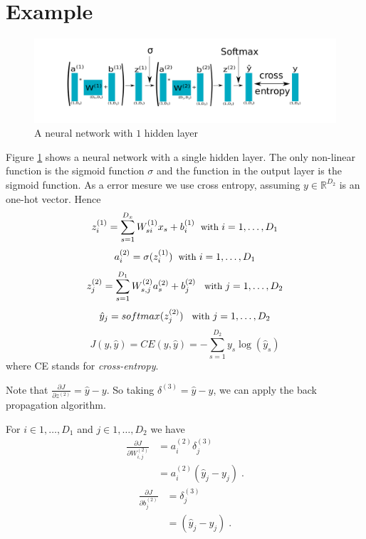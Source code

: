 \documentclass{article}
\begin{document}
\section{Example}

\begin{figure}
\begin{center}
\includegraphics[scale=0.85]{example.pdf}
\end{center}
\caption{A neural network with $1$ hidden layer}
\label{example}
\end{figure}
Figure \ref{example} shows a neural network with a single hidden layer. The only non-linear function is the sigmoid function $\sigma$ and the function in the output layer is the sigmoid function. As a error mesure we use cross entropy, assuming $y \in \mathbb{R}^{D_2}$ is an one-hot vector. Hence
\begin{equation}\label{eq:12}
z^{(1)}_i = \sum_{s=1}^{D_{x}}W^{(1)}_{si} x_{s} + b^{(1)}_{i}  \; {\small \text{ with }i = 1, \dots, D_{1}}
\end{equation}
\begin{equation}\label{eq:13}
a^{(2)}_i = \sigma(z^{(1)}_i )  \; {\small \text{ with }i = 1, \dots,D_{1}}
\end{equation}
\begin{equation}\label{eq:14}
z^{(2)}_j = \sum_{s=1}^{D_{1}}W^{(2)}_{s,j} a^{(2)}_{s} + b^{(2)}_{j} \;\; {\small \text{ with }j = 1, \dots, D_{2}}
\end{equation}
\begin{equation}\label{eq:15}
\hat{y}_j = softmax(z^{(2)}_j) \;\; {\small \text{ with }j = 1, \dots, D_{2}}
\end{equation}
\begin{equation}\label{eq:16}
J(y,\hat{y}) = CE(y,\hat{y}) = -\sum_{s=1}^{D_{2}} y_s  \log(\hat{y}_s)
\end{equation}
where CE stands for \textit{cross-entropy}.

Note that $\frac{\partial J}{\partial  z^{(2)}} = \hat{y} - y$. So taking $\delta^{(3)} = \hat{y} - y$, we can apply the back propagation algorithm.

For $i \in {1,\dots,D_{1}}$ and $j \in {1,\dots,D_{2}}$ we have
\begin{align*}
\frac{\partial J}{\partial W^{(2)}_{i,j}} & = a^{(2)}_{i}\delta^{(3)}_{j}\\
& = a^{(2)}_{i}(\hat{y}_{j} - y_{j})\; .
\end{align*}
\begin{align*}
\frac{\partial J}{\partial b^{(2)}_{j}} & = \delta^{(3)}_{j}\\
& = (\hat{y}_{j} - y_{j})\; .
\end{align*}
\end{document}
